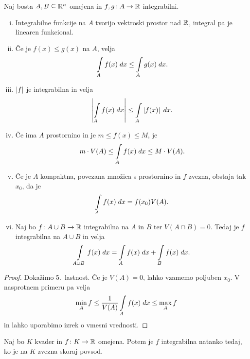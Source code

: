 \begin{izrek}
Naj bosta $A, B \subseteq \mathbb{R}^n$ omejena in $f, g \colon A \to \mathbb{R}$
integrabilni.

\begin{enumerate}[i)]
\item Integrabilne funkcije na $A$ tvorijo vektroski prostor nad
$\mathbb{R}$, integral pa je linearen funkcional.
\item Če je $f(x) \leq g(x)$ na $A$, velja
\[
\int\limits_A f(x)\;dx \leq \int\limits_A g(x)\;dx.
\]
\item $\left\lvert f\right\rvert$ je integrabilna in velja
\[
\left\lvert \int\limits_A f(x)\;dx\right\rvert \leq \int\limits_A \left\lvert f(x)\right\rvert\;dx.
\]
\item Če ima $A$ prostornino in je $m \leq f(x) \leq M$, je
\[
m \cdot V(A) \leq \int\limits_A f(x)\;dx \leq M \cdot V(A).
\]
\item Če je $A$ kompaktna, povezana množica s prostornino in $f$
zvezna, obstaja tak $x_0$, da je
\[
\int\limits_A f(x)\;dx = f(x_0) V(A).
\]
\item Naj bo $f \colon A \cup B \to \mathbb{R}$ integrabilna na $A$ in $B$
ter $V(A \cap B) = 0$. Tedaj je $f$ integrabilna na $A \cup B$ in
velja
\[
\int\limits_{A \cup B} f(x)\;dx = \int\limits_A f(x)\;dx + \int\limits_B f(x)\;dx.
\]
\end{enumerate} 
\end{izrek}

\begin{proof}
Dokažimo 5.\ lastnost. Če je $V(A) = 0$, lahko vzamemo poljuben
$x_0$. V nasprotnem primeru pa velja
\[
\min_A f \leq \frac{1}{V(A)} \int\limits_A f(x)\;dx \leq \max_A f
\]
in lahko uporabimo izrek o vmesni vrednosti.
\end{proof}

\begin{izrek}[Lebesgue]
Naj bo $K$ kvader in $f \colon K \to \mathbb{R}$ omejena. Potem je $f$
integrabilna natanko tedaj, ko je na $K$ zvezna skoraj povsod.
\end{izrek}

